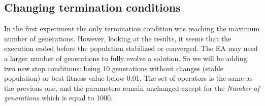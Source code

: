 \documentclass[sigconf]{acmart}
\begin{document}
\subsection{Changing termination conditions} \label{E2}

In the first experiment the only termination condition was reaching the maximum 
number of generations. %
However, looking at the results, it seems that the 
execution ended before the population stabilized or converged.
The EA may need a 
larger number of generations to fully evolve a solution.
So we will be adding two new stop 
conditions: being 10 generations without changes (stable population) or best 
fitness value below 0.01. 
The set of operators is the same as the previous one, and the parameters remain 
unchanged except for the \textit{Number of generations} which is equal to 1000. 
\end{document}

